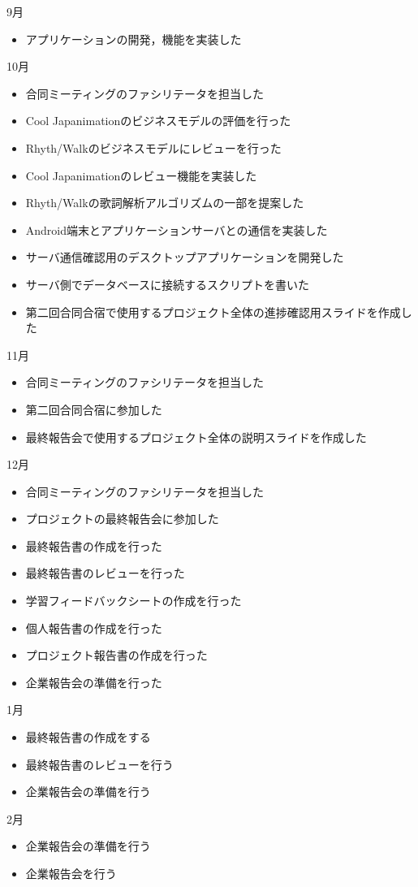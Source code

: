 \newpage
9月
\begin{itemize}
\item アプリケーションの開発，機能を実装した
\end{itemize}
10月
\begin{itemize}
\item 合同ミーティングのファシリテータを担当した
\item Cool Japanimationのビジネスモデルの評価を行った
\item Rhyth/Walkのビジネスモデルにレビューを行った
\item Cool Japanimationのレビュー機能を実装した
\item Rhyth/Walkの歌詞解析アルゴリズムの一部を提案した
\item Android端末とアプリケーションサーバとの通信を実装した
\item サーバ通信確認用のデスクトップアプリケーションを開発した
\item サーバ側でデータベースに接続するスクリプトを書いた
\item 第二回合同合宿で使用するプロジェクト全体の進捗確認用スライドを作成した
\end{itemize}
11月
\begin{itemize}
\item 合同ミーティングのファシリテータを担当した
\item 第二回合同合宿に参加した
\item 最終報告会で使用するプロジェクト全体の説明スライドを作成した
\end{itemize}
12月
\begin{itemize}
\item 合同ミーティングのファシリテータを担当した
\item プロジェクトの最終報告会に参加した
\item 最終報告書の作成を行った
\item 最終報告書のレビューを行った
\item 学習フィードバックシートの作成を行った
\item 個人報告書の作成を行った
\item プロジェクト報告書の作成を行った
\item 企業報告会の準備を行った
\end{itemize}
1月
\begin{itemize}
\item 最終報告書の作成をする
\item 最終報告書のレビューを行う
\item 企業報告会の準備を行う
\end{itemize}
2月
\begin{itemize}
\item 企業報告会の準備を行う
\item 企業報告会を行う
\end{itemize}

